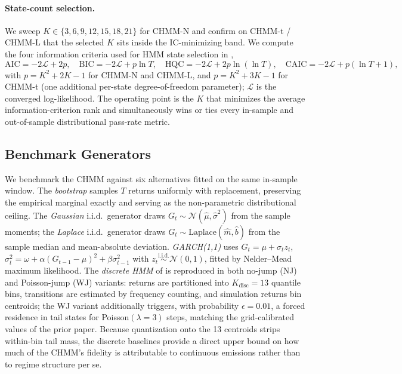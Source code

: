 \paragraph{State-count selection.}
We sweep $K \in \{3, 6, 9, 12, 15, 18, 21\}$ for CHMM-N and confirm on
CHMM-t / CHMM-L that the selected $K$ sits inside the IC-minimizing band.
We compute the four information criteria used for HMM state selection
in \citet{nguyen2018hidden},
\begin{equation}
    \text{AIC} = -2\mathcal{L} + 2p,\quad
    \text{BIC} = -2\mathcal{L} + p \ln T,\quad
    \text{HQC} = -2\mathcal{L} + 2p \ln(\ln T),\quad
    \text{CAIC} = -2\mathcal{L} + p(\ln T + 1),
    \label{eq:information_criteria}
\end{equation}
with $p = K^2 + 2K - 1$ for CHMM-N and CHMM-L, and $p = K^2 + 3K - 1$
for CHMM-t (one additional per-state degree-of-freedom parameter);
$\mathcal{L}$ is the converged log-likelihood.
The operating point is the $K$ that minimizes the average information-criterion
rank and simultaneously wins or ties every in-sample and out-of-sample
distributional pass-rate metric.

\subsection{Benchmark Generators}
\label{sec:benchmarks}

We benchmark the CHMM against six alternatives fitted on the same in-sample window.
The \textit{bootstrap} samples $T$ returns uniformly with replacement, preserving the empirical marginal exactly and serving as the non-parametric distributional ceiling.
The \textit{Gaussian} i.i.d.\ generator draws $G_t \sim \mathcal{N}(\hat\mu, \hat\sigma^2)$ from the sample moments; the \textit{Laplace} i.i.d.\ generator draws $G_t \sim \text{Laplace}(\hat m, \hat b)$ from the sample median and mean-absolute deviation.
\textit{GARCH(1,1)} \cite{bollerslev1986generalized} uses $G_t = \mu + \sigma_t z_t$, $\sigma_t^2 = \omega + \alpha(G_{t-1} - \mu)^2 + \beta \sigma_{t-1}^2$ with $z_t \overset{\text{i.i.d.}}{\sim} \mathcal{N}(0, 1)$, fitted by Nelder--Mead maximum likelihood.
\label{sec:discrete_hmm}%
The \textit{discrete HMM} of \citet{alswaidan2026hybrid} is reproduced in both no-jump (NJ) and Poisson-jump (WJ) variants: returns are partitioned into $K_{\text{disc}} = 13$ quantile bins, transitions are estimated by frequency counting, and simulation returns bin centroids; the WJ variant additionally triggers, with probability $\epsilon = 0.01$, a forced residence in tail states for Poisson$(\lambda = 3)$ steps, matching the grid-calibrated values of the prior paper.
Because quantization onto the 13 centroids strips within-bin tail mass, the discrete baselines provide a direct upper bound on how much of the CHMM's fidelity is attributable to continuous emissions rather than to regime structure per se.

